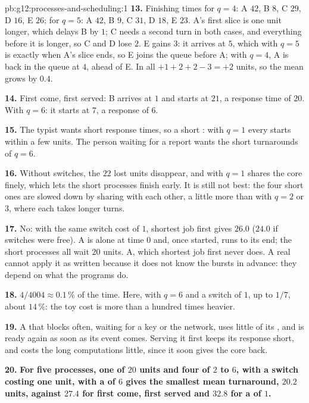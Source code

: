 \begin{solution}{pb:g12:processes-and-scheduling:1}
\textbf{13.} Finishing times for $q = 4$: A $42$, B $8$, C $29$, D $16$, E $26$; for $q = 5$: A $42$, B $9$, C $31$,
D $18$, E $23$. A's first slice is one unit longer, which delays B by $1$; C needs a second turn in both cases, and
everything before it is longer, so C and D lose $2$. E gains $3$: it arrives at $5$, which with $q = 5$ is exactly
when A's slice ends, so E joins the queue before A; with $q = 4$, A is back in the queue at $4$, ahead of E. In all
$+1 + 2 + 2 - 3 = +2$ units, so the mean grows by $0.4$.

\textbf{14.} First come, first served: B arrives at $1$ and starts at $21$, a response time of $20$. With $q = 6$:
it starts at $7$, a response of $6$.

\textbf{15.} The typist wants short response times, so a short : with $q = 1$ every  starts within a
few units. The person waiting for a report wants the short turnarounds of $q = 6$.

\textbf{16.} Without switches, the $22$ lost units disappear, and  with $q = 1$ shares the core finely,
which lets the short processes finish early. It is still not best: the four short ones are slowed down by sharing
with each other, a little more than with $q = 2$ or $3$, where each takes longer turns.

\textbf{17.} No: with the same switch cost of $1$, shortest job first gives $26.0$ ($24.0$ if switches were free). A is alone at time $0$ and, once started, runs to its end; the
short processes all wait $20$ units.   A, which shortest job first never does. A real 
cannot apply it as written because it does not know the bursts in advance: they depend on what the programs do.

\textbf{18.} $4 / 4004 \approx 0.1\,\%$ of the time. Here, with $q = 6$ and a switch of $1$, up to $1/7$, about
$14\,\%$: the toy cost is more than a hundred times heavier.

\textbf{19.} A  that blocks often, waiting for a key or the network, uses little of its , and is ready
again as soon as its event comes. Serving it first keeps its response short, and costs the long computations little,
since it soon gives the core back.

\textbf{20.} \textbf{For five processes, one of $20$ units and four of $2$ to $6$, with a switch costing one unit,
 with a  of $6$ gives the smallest mean turnaround, $20.2$ units, against $27.4$ for first come,
first served and $32.8$ for a  of $1$.}
\end{solution}
